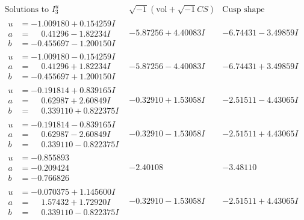 \documentclass[1p]{elsarticle_modified}
\theoremstyle{definition}
\newcommand{\I}{\sqrt{-1}}
\begin{document}
$$\begin{array}{c|c|c}  
\text{Solutions to }I^u_{3}& \I (\text{vol} + \sqrt{-1}CS) & \text{Cusp shape}\\
 \hline 
\begin{aligned}
u &= -1.009180 + 0.154259 I \\
a &= \phantom{-}0.41296 - 1.82234 I \\
b &= -0.455697 - 1.200150 I\end{aligned}
 & -5.87256 + 4.40083 I & -6.74431 - 3.49859 I \\ \hline\begin{aligned}
u &= -1.009180 - 0.154259 I \\
a &= \phantom{-}0.41296 + 1.82234 I \\
b &= -0.455697 + 1.200150 I\end{aligned}
 & -5.87256 - 4.40083 I & -6.74431 + 3.49859 I \\ \hline\begin{aligned}
u &= -0.191814 + 0.839165 I \\
a &= \phantom{-}0.62987 + 2.60849 I \\
b &= \phantom{-}0.339110 + 0.822375 I\end{aligned}
 & -0.32910 + 1.53058 I & -2.51511 - 4.43065 I \\ \hline\begin{aligned}
u &= -0.191814 - 0.839165 I \\
a &= \phantom{-}0.62987 - 2.60849 I \\
b &= \phantom{-}0.339110 - 0.822375 I\end{aligned}
 & -0.32910 - 1.53058 I & -2.51511 + 4.43065 I \\ \hline\begin{aligned}
u &= -0.855893\phantom{ +0.000000I} \\
a &= -0.209424\phantom{ +0.000000I} \\
b &= -0.766826\phantom{ +0.000000I}\end{aligned}
 & -2.40108\phantom{ +0.000000I} & -3.48110\phantom{ +0.000000I} \\ \hline\begin{aligned}
u &= -0.070375 + 1.145600 I \\
a &= \phantom{-}1.57432 + 1.72920 I \\
b &= \phantom{-}0.339110 - 0.822375 I\end{aligned}
 & -0.32910 - 1.53058 I & -2.51511 + 4.43065 I \\ \hline\begin{aligned}

\end{aligned}
\end{array}$$
\end{document}
